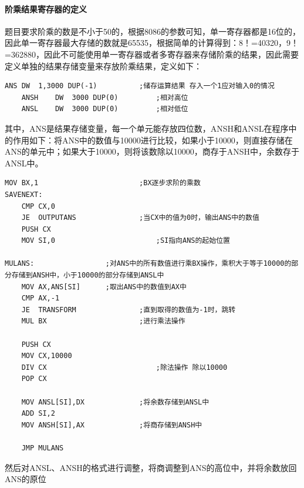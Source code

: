 \documentclass[UTF8,12pt]{article}
\begin{document}
\paragraph{阶乘结果寄存器的定义}
题目要求阶乘的数是不小于50的，根据8086的参数可知，单一寄存器都是16位的，因此单一寄存器最大存储的数就是65535，根据简单的计算得到：8！=40320，9！=362880，因此不可能使用单一寄存器或者多寄存器来存储阶乘的结果，因此需要定义单独的结果存储变量来存放阶乘结果，定义如下：

\begin{lstlisting}[title=阶乘结果寄存器定义,frame=shadowbox]
    ANS	DW	1,3000 DUP(-1)			;储存运算结果 存入一个1应对输入0的情况
    ANSH	DW	3000 DUP(0)			;相对高位
    ANSL	DW	3000 DUP(0)			;相对低位
\end{lstlisting}

其中，ANS是结果存储变量，每一个单元能存放四位数，ANSH和ANSL在程序中的作用如下：将ANS中的数值与10000进行比较，如果小于10000，则直接存储在ANS的单元中；如果大于10000，则将该数除以10000，商存于ANSH中，余数存于ANSL中。

\begin{lstlisting}[title=数乘,frame=shadowbox]
    MOV BX,1						;BX逐步求阶的乘数
SAVENEXT:
	CMP CX,0
	JE	OUTPUTANS				;当CX中的值为0时，输出ANS中的数值
	PUSH CX					
	MOV SI,0						;SI指向ANS的起始位置
	
MULANS:					;对ANS中的所有数值进行乘BX操作，乘积大于等于10000的部分存储到ANSH中，小于10000的部分存储到ANSL中
	MOV AX,ANS[SI]		;取出ANS中的数值到AX中
	CMP AX,-1
	JE	TRANSFORM				;直到取得的数值为-1时，跳转
	MUL BX						;进行乘法操作
	
	PUSH CX	
	MOV CX,10000
	DIV CX							;除法操作 除以10000
	POP CX
		 
	MOV ANSL[SI],DX		    	;将余数存储到ANSL中			
	ADD SI,2
	MOV ANSH[SI],AX		    	;将商存储到ANSH中
	
	JMP	MULANS
\end{lstlisting}

然后对ANSL、ANSH的格式进行调整，将商调整到ANS的高位中，并将余数放回ANS的原位
\end{document}
